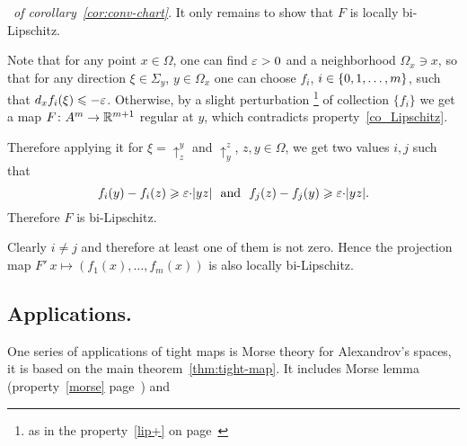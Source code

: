 \documentclass{article}
\begin{document}
\Proof\ {\it of corollary~\ref{cor:conv-chart}}. It only remains to show that
$F$ is locally bi-Lipschitz. 

Note that for any point $x\in \Omega$, one can find $\varepsilon>0$ and a
neighborhood $\Omega_x\ni x$, so that for any direction $\xi\in \Sigma_y$, $y\in\Omega_x$ one can choose $f_i$, $i\z\in \{0,1,\dots,m\}$, such that $d_x f_i(\xi)\leqslant -\varepsilon$. 
Otherwise, by a slight perturbation%
\footnote{as in the property~\ref{lip+} on page~\pageref{lip+}} of collection $\{f_i\}$ we get a map $F\colon A^m\to \mathbb{R}^{m+1}$ regular at $y$, which contradicts property~\ref{co_Lipschitz}.

Therefore applying it for $\xi=\uparrow_z^y$ and $\uparrow_y^z$, $z,y\in\Omega$, we get two values $i,j$ such that 
$$f_i(y)-f_i(z)
\ge 
\eps{\cdot}|y z|
\ \ \text{and}\ \ 
f_j(z)-f_j(y)\ge \eps{\cdot}|y z|.
$$
Therefore $F$ is bi-Lipschitz.

Clearly $i\not=j$ and therefore at least one of them is not zero.
Hence the projection map $F'\:x\mapsto(f_1(x),\dots,f_m(x))$ is also locally
bi-Lipschitz.
\qeds





\subsection{Applications.}
\label{app-tight} 

One series of applications of tight maps is Morse theory 
for Alexandrov's spaces, it is based on the
main theorem~\ref{thm:tight-map}. 
It includes Morse lemma (property~\ref{morse} page~\pageref{morse}) and
\end{document}
